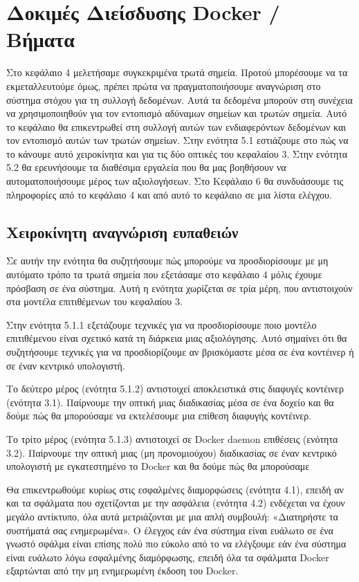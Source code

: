 \chapter{Δοκιμές Διείσδυσης \textlatin{Docker} / Βήματα}
\label{dockerPenTesting}

Στο κεφάλαιο 4 μελετήσαμε συγκεκριμένα τρωτά σημεία. Προτού μπορέσουμε να τα
εκμεταλλευτούμε όμως, πρέπει πρώτα να πραγματοποιήσουμε αναγνώριση στο
σύστημα στόχου για τη συλλογή δεδομένων. Αυτά τα δεδομένα μπορούν στη συνέχεια
να χρησιμοποιηθούν για τον εντοπισμό αδύναμων σημείων και
τρωτών σημεία. Αυτό το κεφάλαιο θα επικεντρωθεί στη συλλογή αυτών των
ενδιαφερόντων δεδομένων και τον εντοπισμό αυτών των τρωτών σημείων.
Στην ενότητα 5.1 εστιάζουμε στο πώς να το κάνουμε αυτό χειροκίνητα και για τις
δύο οπτικές του κεφαλαίου 3. Στην ενότητα 5.2 θα ερευνήσουμε τα διαθέσιμα
εργαλεία που θα μας βοηθήσουν να αυτοματοποιήσουμε μέρος των αξιολογήσεων. Στο
Κεφάλαιο 6 θα συνδυάσουμε τις πληροφορίες από το κεφάλαιο 4 και από αυτό το
κεφάλαιο σε μια λίστα ελέγχου.

\section{Χειροκίνητη αναγνώριση ευπαθειών}

Σε αυτήν την ενότητα θα συζητήσουμε πώς μπορούμε να προσδιορίσουμε με μη
αυτόματο τρόπο τα τρωτά σημεία που εξετάσαμε στο κεφάλαιο 4 μόλις έχουμε
πρόσβαση σε ένα σύστημα. Αυτή η ενότητα χωρίζεται σε τρία μέρη, που
αντιστοιχούν στα μοντέλα επιτιθέμενων του κεφαλαίου 3.

Στην ενότητα 5.1.1 εξετάζουμε τεχνικές για να προσδιορίσουμε ποιο μοντέλο
επιτιθέμενου είναι σχετικό κατά τη διάρκεια μιας αξιολόγησης. Αυτό σημαίνει ότι
θα συζητήσουμε τεχνικές για να προσδιορίζουμε αν βρισκόμαστε μέσα σε ένα
κοντέινερ ή σε έναν κεντρικό υπολογιστή.

Το δεύτερο μέρος (ενότητα 5.1.2) αντιστοιχεί αποκλειστικά στις διαφυγές
κοντέινερ (ενότητα 3.1). Παίρνουμε την οπτική μιας διαδικασίας μέσα σε ένα
δοχείο και θα δούμε πώς θα μπορούσαμε να εκτελέσουμε μια επίθεση διαφυγής
κοντέινερ.

Το τρίτο μέρος (ενότητα 5.1.3) αντιστοιχεί σε \textlatin{Docker daemon}
επιθέσεις (ενότητα 3.2). Παίρνουμε την οπτική μιας (μη προνομιούχου) διαδικασίας
σε έναν κεντρικό υπολογιστή με εγκατεστημένο το \textlatin{Docker} και θα δούμε
πώς θα μπορούσαμε 

Θα επικεντρωθούμε κυρίως στις εσφαλμένες διαμορφώσεις (ενότητα 4.1), επειδή
αν και τα σφάλματα που σχετίζονται με την ασφάλεια (ενότητα 4.2) ενδέχεται να
έχουν μεγάλο αντίκτυπο, όλα αυτά μετριάζονται με μια απλή συμβουλή:
«Διατηρήστε τα συστήματά σας ενημερωμένα». Ο έλεγχος εάν ένα σύστημα είναι
ευάλωτο σε ένα γνωστό σφάλμα είναι επίσης πολύ πιο εύκολο από το να ελέγξουμε
εάν ένα σύστημα είναι ευάλωτο λόγω εσφαλμένης διαμόρφωσης, επειδή όλα τα
σφάλματα \textlatin{Docker} εξαρτώνται από την μη ενημερωμένη έκδοση του
\textlatin{Docker}.


